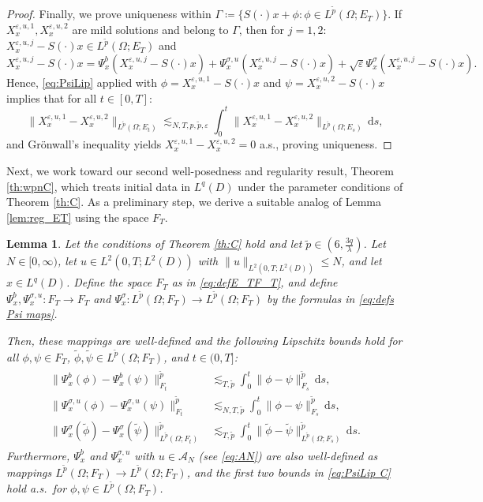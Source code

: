 \documentclass{amsart}
\theoremstyle{plain}
\theoremstyle{remark}
\theoremstyle{plain}
\newtheorem{lemma}[theorem]{Lemma}
\numberwithin{equation}{section}
\newcommand{\ceqq}{\coloneqq}
\newcommand{\col}{\colon}
\newcommand{\eps}{\varepsilon}
\newcommand{\Om}{\Omega}
\newcommand{\A}{{\mathcal A}}
\newcommand{\dd}{\,\mathrm{d}}
\begin{document}
\begin{proof}
Finally, we prove uniqueness within $\Gamma\ceqq \{S(\cdot)x+\phi:\phi\in L^{\tilde p}(\Om;E_T)\}$.  If $X_x^{\eps,u,1}, X_x^{\eps,u,2}$ are mild solutions and belong to $\Gamma$, then for $j=1,2$: $X_x^{\eps,u,j}-S(\cdot)x \in L^{\tilde p}(\Om;E_T)$ and 
\[
X_x^{\eps,u,j}-S(\cdot)x=\Psi_x^b(X_x^{\eps,u,j}-S(\cdot)x)+\Psi_x^{\sigma,u}(X_x^{\eps,u,j}-S(\cdot)x)+\sqrt{\eps}\Psi_x^\sigma(X_x^{\eps,u,j}-S(\cdot)x).
\]
Hence, \eqref{eq:PsiLip} applied with $\phi=X_x^{\eps,u,1}-S(\cdot)x$ and $\psi=X_x^{\eps,u,2}-S(\cdot)x$ implies that for all $t\in[0,T]$:  
$$
\|X_x^{\eps,u,1}-{X}_x^{\eps,u,2}\|_{L^{\tilde p}(\Om;E_t)}\lesssim_{N,T,p,\tilde p,\eps}\int_0^t\|X_x^{\eps,u,1}- {X}_x^{\eps,u,2}\|_{L^{\tilde p}(\Om;E_s)}\dd s,
$$ 
and Gr\"onwall's inequality yields $X_x^{\eps,u,1}-{X}_x^{\eps,u,2}=0$ a.s., proving uniqueness. 
\end{proof}


Next, we work toward our second well-posedness and regularity result, Theorem \ref{th:wpnC}, which treats   initial data in $L^q(D)$ under the parameter conditions of Theorem \ref{th:C}. 
As a preliminary step, we derive a suitable analog of Lemma \ref{lem:reg_ET} using the space $F_T$. 

\begin{lemma}\label{lem:regC}
Let the conditions of Theorem \ref{th:C} hold and let $\tilde{p}\in (6,\frac{3q}{\lambda})$.     
Let  $N\in[0,\infty)$, let $u\in L^2(0,T;L^2(D))$ with $\|u\|_{L^2(0,T;L^2(D))}\leq N$, and let $x\in L^q(D)$. 
Define the space $F_T$ as in \eqref{eq:defE_TF_T}, 
and define $\Psi_x^b, \Psi_x^{\sigma,u}\col F_T \to F_T$  and $\Psi_x^\sigma\col L^{\tilde p}(\Om;F_T)\to L^{\tilde p}(\Om;F_T)$ by  the formulas in \eqref{eq:defs Psi maps}. 

Then, these mappings are well-defined and the following Lipschitz bounds hold for all   $\phi,\psi \in F_T$,   $\tilde\phi,\tilde\psi\in L^{\tilde p}(\Om;F_T)$, and $t\in(0,T]$:
\begin{align}\label{eq:PsiLip C}
\begin{split}
\|\Psi_x^{b}(\phi)-\Psi_x^{b}(\psi)\|_{F_t}^{\tilde{p}} 
    &\lesssim_{T,\tilde p} \int_0^t \|\phi-\psi\|_{F_s}^{\tilde{p}}\dd s,\\ 
    \|\Psi_x^{\sigma,u}(\phi)-\Psi_x^{\sigma,u}(\psi)\|_{F_t}^{\tilde p} 
    &\lesssim_{N,T,\tilde p} \int_0^t \|\phi-\psi\|_{F_s}^{\tilde p} \dd s,\\ 
    \|\Psi_x^{\sigma}(\tilde\phi)-\Psi_x^{\sigma}(\tilde\psi)\|_{L^{\tilde{p}}(\Om;F_t)}^{\tilde{p}}
    &\lesssim_{T,\tilde p} \int_0^t \|\tilde\phi-\tilde\psi\|_{L^{\tilde{p}}(\Om;F_s)}^{\tilde{p}}\dd s.  
 \end{split}
 \end{align}  
 Furthermore,  $\Psi_x^b$ and $\Psi_x^{\sigma,u}$ with $u\in \A_N$ (see \eqref{eq:AN}) are also well-defined as mappings $L^{\tilde p}(\Om;F_T)\to L^{\tilde p}(\Om;F_T)$, and the first two bounds in \eqref{eq:PsiLip C} hold a.s.\ for $\phi,\psi\in L^{\tilde p}(\Om;F_T)$. 
\end{lemma}
\end{document}
